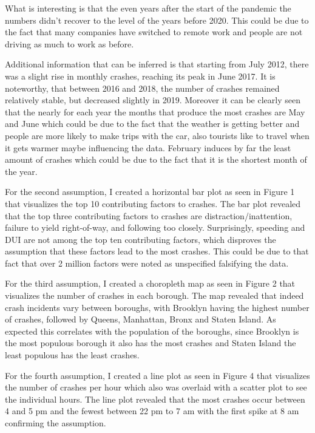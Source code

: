 \documentclass[runningheads]{llncs}
\begin{document}
What is interesting is that the even years after the start of the pandemic the numbers didn't recover to the level of the years before 2020. 
This could be due to the fact that many companies have switched to remote work and people are not driving as much to work as before.

Additional information that can be inferred is that starting from July 2012, there was a slight rise in monthly crashes, reaching its peak in June 2017. 
It is noteworthy, that between 2016 and 2018, the number of crashes remained relatively stable, but decreased slightly in 2019.
Moreover it can be clearly seen that the nearly for each year the months that produce the most crashes are May and June which could be due to the fact that
the weather is getting better and people are more likely to make trips with the car, also tourists like to travel when it gets warmer maybe influencing the data.
February induces by far the least amount of crashes which could be due to the fact that it is the shortest month of the year.

For the second assumption, I created a horizontal bar plot as seen in Figure 1 that visualizes the top 10 contributing factors to crashes.
The bar plot revealed that the top three contributing factors to crashes are distraction/inattention, failure to yield right-of-way, and following too closely.
Surprisingly, speeding and DUI are not among the top ten contributing factors, which disproves the assumption that these factors lead to the most crashes.
This could be due to that fact that over 2 million factors were noted as unspecified falsifying the data.

For the third assumption, I created a choropleth map as seen in Figure 2 that visualizes the number of crashes in each borough.
The map revealed that indeed crash incidents vary between boroughs, with Brooklyn having the highest number of crashes, 
followed by Queens, Manhattan, Bronx and Staten Island. As expected this correlates with the population of the boroughs,
since Brooklyn is the most populous borough it also has the most crashes and Staten Island the least populous has the least crashes.

For the fourth assumption, I created a line plot as seen in Figure 4 that visualizes the number of crashes per hour which also was overlaid with a scatter plot to see the 
individual hours. The line plot revealed that the most crashes occur between 4 and 5 pm and the fewest between 22 pm to 7 am with the first spike at 8 am confirming the assumption.
\end{document}
